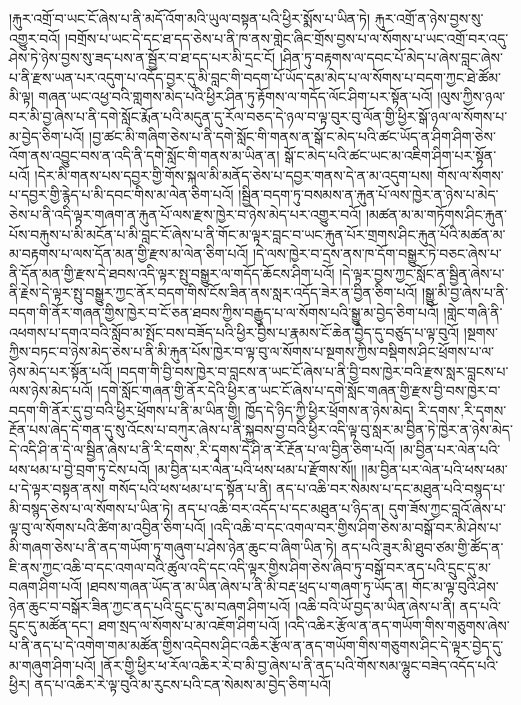 །རྐུར་འགྲོ་བ་ཡང་ངོ་ཞེས་པ་ནི་མདོ་འོག་མའི་ཡུལ་བསྟན་པའི་ཕྱིར་སྨོས་པ་ཡིན་ཏེ། རྐུར་འགྲོ་ན་ཉེས་བྱས་སུ་འགྱུར་བའོ། །བགྲོས་པ་ཡང་དེ་དང་ཐ་དད་ཅེས་པ་ནི་ཁ་ནས་གླེང་ཞིང་གྲོས་བྱས་པ་ལ་སོགས་པ་ཡང་འགྲོ་བར་འདུ་ཤེས་ཏེ་ཉེས་བྱས་སུ་ཟད་པས་ན་སྦྱོར་བ་ཐ་དད་པར་མི་དྲང་ངོ། །ཤིན་ཏུ་བརྟགས་ལ་དབང་པོ་མེད་པ་ཞེས་བླང་ཞེས་པ་ནི་རྫས་ཡན་པར་འདུག་པ་འདོད་བྱར་དུ་མི་བླང་གི་བདག་པོ་ཡོད་དམ་མེད་པ་ལ་སོགས་པ་བདག་ཀྱང་ཐེ་ཚོམ་མི་ལྟ། གཞན་ཡང་འཕྱ་བའི་གླགས་མེད་པའི་ཕྱིར་ཤིན་ཏུ་རྟོགས་ལ་གདོད་ལོང་ཤིག་པར་སྟོན་པའོ། །ལུས་ཀྱིས་ཉལ་བར་མི་བྱ་ཞེས་པ་ནི་དགེ་སློང་རྨོན་པའི་མདུན་དུ་རོལ་བཅད་དེ་ཉལ་བ་ལྟ་བུར་བུ་ལོན་གྱི་ཕྱིར་སྒོ་ཉལ་ལ་སོགས་པ་མ་བྱེད་ཅིག་པའོ། །བྱ་ཚང་མི་གཞིག་ཅེས་པ་ནི་དགེ་སློང་གི་གནས་ན་སྒོ་ང་མེད་པའི་ཚང་ཡོད་ན་ཤིག་ཤིག་ཅེས་འོག་ནས་འབྱུང་བས་ན་འདི་ནི་དགེ་སློང་གི་གནས་མ་ཡིན་ན། སྒོ་ང་མེད་པའི་ཚང་ཡང་མ་འཇིག་ཤིག་པར་སྟོན་པའོ། །དེར་མི་གནས་པས་དབྱར་གྱི་གོས་སྐལ་མི་མནོད་ཅེས་པ་དབྱར་གནས་དེ་ན་མ་འདུག་པས། གོས་ལ་སོགས་པ་དབྱར་གྱི་རྙེད་པ་མི་དབང་གིས་མ་ལེན་ཅིག་པའོ། །སྦྱིན་བདག་ཏུ་བསམས་ན་རྐུན་པོ་ལས་ཁྱེར་ན་ཉེས་པ་མེད་ཅེས་པ་ནི་འདི་ལྟར་གཞག་ན་རྐུན་པོ་ལས་རྫས་ཁྱེར་བ་ཉེས་མེད་པར་འགྱུར་བའོ། །མཚན་མ་མ་གཏོགས་ཤིང་རྐུན་པོས་བརྐུས་པ་མི་མངོན་པ་མི་བླང་ངོ་ཞེས་པ་ནི་གོང་མ་ལྟར་བླང་བ་ཡང་རྐུན་པོར་གྲགས་ཤིང་རྐུན་པོའི་མཚན་མ་མ་བརྟགས་པ་ལས་དོན་མན་གྱི་རྫས་མ་ལེན་ཅིག་པའོ། །དེ་ལས་ཁྱེར་བ་དྲས་ནས་ཁ་དོག་བསྒྱུར་ཏེ་བཅང་ཞེས་པ་ནི་དོན་མན་གྱི་རྫས་དེ་ཐབས་འདི་ལྟར་སྤུ་བསྒྱུར་ལ་གདོད་ཆོངས་ཤིག་པའོ། །དེ་ལྟར་བྱས་ཀྱང་སློང་ན་སྦྱིན་ཞེས་པ་ནི་རྗེས་དེ་ལྟར་སྤུ་བསྒྱུར་ཀྱང་ནོར་བདག་གིས་ངོས་ཟིན་ནས་སླར་འདོད་ཟེར་ན་བྱིན་ཅིག་པའོ། །སྒྱུ་མི་བྱ་ཞེས་པ་ནི་བདག་གི་ནོར་གཞན་གྱིས་ཁྱེར་བ་ངོ་ཅན་ཐབས་ཀྱིས་བརྒྱུད་པ་ལ་སོགས་པའི་སྒྱུ་མ་བྱེད་ཅིག་པའོ། །གླེང་གཞི་ནི་འཕགས་པ་དགའ་བའི་སློབ་མ་སྤོང་བས་བཟོད་པའི་ཕྱིར་བྱིས་པ་རྣམས་ངོ་ཆེན་བྱེད་དུ་བཙུད་པ་ལྟ་བུའོ། །སྔགས་ཀྱིས་བཏང་བ་ཉེས་མེད་ཅེས་པ་ནི་མི་རྐུན་པོས་ཁྱེར་བ་ལྟ་བུ་ལ་སོགས་པ་སྔགས་ཀྱིས་བསྡིགས་ཤིང་ཕྲོགས་པ་ལ་ཉེས་མེད་པར་སྟོན་པའོ། །བདག་གི་བྱི་བས་ཁྱེར་བ་བླངས་ན་ཡང་ངོ་ཞེས་པ་ནི་བྱི་བས་ཁྱེར་བའི་རྫས་སླར་བླངས་པ་ལས་ཉེས་མེད་པའོ། །དགེ་སློང་གཞན་གྱི་ནོར་དེའི་ཕྱིར་ན་ཡང་ངོ་ཞེས་པ་དགེ་སློང་གཞན་གྱི་རྫས་བྱི་བས་ཁྱེར་བ་བདག་གི་ནོར་དུ་བྱ་བའི་ཕྱིར་ཕྲོགས་པ་ནི་མ་ཡིན་གྱི། ཁྱོད་དེ་ཉིད་ཀྱི་ཕྱིར་ཕྲོགས་ན་ཉེས་མེད། {རི་དགས་,རི་དྭགས་}རྔོན་པས་ཞེད་དེ་གན་དུ་སུ་འོངས་པ་བཀུར་ཞེས་པ་ནི་སྐྱབས་བྱ་བའི་ཕྱིར་འདི་ལྟ་བུ་སླར་མ་བྱིན་ཏེ་ཁྱེར་ན་ཉེས་མེད་དེ་འདི་ཤི་ན་དེ་ལ་སྦྱིན་ཞེས་པ་ནི་{རི་དགས་,རི་དྭགས་}དེ་ཤི་ན་རོ་རྔོན་པ་ལ་བྱིན་ཅིག་པའོ། །མ་བྱིན་པར་ལེན་པའི་ཕས་ཕམ་པ་བྱེ་བྲག་ཏུ་ངེས་པའོ། །མ་བྱིན་པར་ལེན་པའི་ཕས་ཕམ་པ་རྫོགས་སོ།། །།མ་བྱིན་པར་ལེན་པའི་ཕས་ཕམ་པ་དེ་ལྟར་བསྟན་ནས། གསོད་པའི་ཕས་ཕམ་པ་ད་སྟོན་པ་ནི། ནད་པ་འཆི་བར་སེམས་པ་དང་མཐུན་པའི་བསྙད་པ་མི་བསྙད་ཅེས་པ་ལ་སོགས་པ་ཡིན་ཏེ། ནད་པ་འཆི་བར་འདོད་པ་དང་མཐུན་པ་ཉིད་ན། དུག་ཟོས་ཀྱང་བླའོ་ཞེས་པ་ལྟ་བུ་ལ་སོགས་པའི་ཚིག་མ་འབྱིན་ཅིག་པའོ། །འདི་འཆི་བ་དང་འགལ་བར་གྱིས་ཤིག་ཅེས་མ་བསྒོ་བར་མི་ཤེས་པ་མི་གཞག་ཅེས་པ་ནི་ནད་གཡོག་ཏུ་གཞུག་པ་ཤེས་ཉེན་ཆུང་བ་ཞིག་ཡིན་ཏེ། ནད་པའི་ཟུར་མི་ཐུབ་ཙམ་གྱི་ཚོད་ན་ཇི་ནས་ཀྱང་འཆི་བ་དང་འགལ་བའི་ཚུལ་འདི་དང་འདི་ལྟར་གྱིས་ཤིག་ཅེས་ཞིབ་ཏུ་བསྒོ་བར་ནད་པའི་དྲུང་དུ་མ་བཞག་ཤིག་པའོ། །ཐབས་གཞན་ཡོད་ན་མ་ཡིན་ཞེས་པ་ནི་མི་བརྡ་ཕྲད་པ་གཞག་ཏུ་ཡོད་ན། གོང་མ་ལྟ་བུའི་ཤེས་ཉེན་ཆུང་བ་བསྒོར་ཟིན་ཀྱང་ནད་པའི་དྲུང་དུ་མ་བཞག་ཤིག་པའོ། །འཆི་བའི་ཡོ་བྱད་མ་ཡིན་ཞེས་པ་ནི། ནད་པའི་དྲུང་དུ་མཚོན་དང་། ཐག་སྲད་ལ་སོགས་པ་མ་འཇོག་ཤིག་པའོ། །འདི་འཆིར་རྩོལ་ན་ནད་གཡོག་གིས་གཅུགས་ཞེས་པ་ནི་ནད་པ་དེ་འགེག་གམ་མཚོན་གྱིས་འདེབས་ཤིང་འཆིར་རྩོལ་ན་ནད་གཡོག་གིས་གཅུགས་ཤིང་དེ་ལྟར་བྱེད་དུ་མ་གཞུག་ཤིག་པའོ། །ནོར་གྱི་ཕྱིར་ཕ་རོལ་འཆིར་རེ་བ་མི་བྱ་ཞེས་པ་ནི་ནད་པའི་གོས་སམ་ལྷུང་བཟེད་འདོད་པའི་ཕྱིར། ནད་པ་འཆིར་རེ་ལྟ་བུའི་མ་རུངས་པའི་ངན་སེམས་མ་བྱེད་ཅིག་པའོ། 